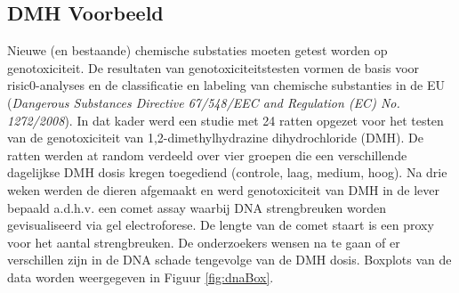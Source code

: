 \documentclass[12pt,dutch,coursenotes]{book}
\theoremstyle{definition}
\theoremstyle{definition}
\theoremstyle{definition}
\theoremstyle{remark}
\begin{document}
\subsection{DMH Voorbeeld}\label{dmh-voorbeeld}

Nieuwe (en bestaande) chemische substaties moeten getest worden op
genotoxiciteit. De resultaten van genotoxiciteitstesten vormen de basis
voor risic0-analyses en de classificatie en labeling van chemische
substanties in de EU (\emph{Dangerous Substances Directive 67/548/EEC
and Regulation (EC) No. 1272/2008}). In dat kader werd een studie met 24
ratten opgezet voor het testen van de genotoxiciteit van
1,2-dimethylhydrazine dihydrochloride (DMH). De ratten werden at random
verdeeld over vier groepen die een verschillende dagelijkse DMH dosis
kregen toegediend (controle, laag, medium, hoog). Na drie weken werden
de dieren afgemaakt en werd genotoxiciteit van DMH in de lever bepaald
a.d.h.v. een comet assay waarbij DNA strengbreuken worden gevisualiseerd
via gel electroforese. De lengte van de comet staart is een proxy voor
het aantal strengbreuken. De onderzoekers wensen na te gaan of er
verschillen zijn in de DNA schade tengevolge van de DMH dosis. Boxplots
van de data worden weergegeven in Figuur \ref{fig:dnaBox}.
\end{document}
